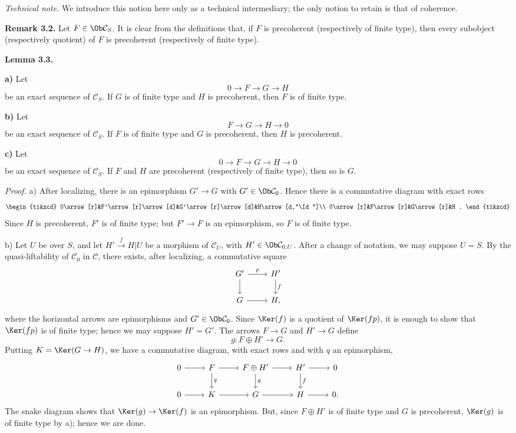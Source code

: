 \emph{Technical note.} We introduce this notion here only as a technical intermediary; the only notion to retain is that of coherence.

\textbf{Remark 3.2.} Let \(F\in\Ob\mathcal C_S\). It is clear from the definitions that, if \(F\) is precoherent (respectively of finite type), then every subobject (respectively quotient) of \(F\) is precoherent (respectively of finite type).

\textbf{Lemma 3.3.}

\textbf{a)} Let
\[
  0\longrightarrow F\longrightarrow G\longrightarrow H
\]
be an exact sequence of \(\mathcal C_S\). If \(G\) is of finite type and \(H\) is precoherent, then \(F\) is of finite type.

\textbf{b)} Let
\[
  F\longrightarrow G\longrightarrow H\longrightarrow 0
\]
be an exact sequence of \(\mathcal C_S\). If \(F\) is of finite type and \(G\) is precoherent, then \(H\) is precoherent.

\textbf{c)} Let
\[
  0\longrightarrow F\longrightarrow G\longrightarrow H\longrightarrow 0
\]
be an exact sequence of \(\mathcal C_S\). If \(F\) and \(H\) are precoherent (respectively of finite type), then so is \(G\).

\emph{Proof.} a) After localizing, there is an epimorphism \(G'\to G\) with \(G'\in\Ob\mathcal C_0\). Hence there is a commutative diagram with exact rows
\[
\begin{tikzcd}
0\arrow[r]&F'\arrow[r]\arrow[d]&G'\arrow[r]\arrow[d]&H\arrow[d,"\Id"]\\
0\arrow[r]&F\arrow[r]&G\arrow[r]&H .
\end{tikzcd}
\]
Since \(H\) is precoherent, \(F'\) is of finite type; but \(F'\to F\) is an epimorphism, so \(F\) is of finite type.

b) Let \(U\) be over \(S\), and let \(H'\xrightarrow{f}H|U\) be a morphism of \(\mathcal C_U\), with \(H'\in\Ob\mathcal C_{0,U}\). After a change of notation, we may suppose \(U=S\). By the quasi-liftability of \(\mathcal C_0\) in \(\mathcal C\), there exists, after localizing, a commutative square
\[
\begin{tikzcd}
G' \arrow[r,"p"] \arrow[d] & H' \arrow[d,"f"]\\
G \arrow[r] & H,
\end{tikzcd}
\]
where the horizontal arrows are epimorphisms and \(G'\in\Ob\mathcal C_0\). Since \(\Ker(f)\) is a quotient of \(\Ker(fp)\), it is enough to show that \(\Ker(fp)\) is of finite type; hence we may suppose \(H'=G'\). The arrows \(F\to G\) and \(H'\to G\) define
\[
  g:F\oplus H'\longrightarrow G.
\]
Putting \(K=\Ker(G\to H)\), we have a commutative diagram, with exact rows and with \(q\) an epimorphism,
\[
\begin{tikzcd}
0\arrow[r]&F\arrow[r]\arrow[d,"q"]&F\oplus H'\arrow[r]\arrow[d,"g"]&H'\arrow[r]\arrow[d,"f"]&0\\
0\arrow[r]&K\arrow[r]&G\arrow[r]&H\arrow[r]&0 .
\end{tikzcd}
\]
The snake diagram shows that \(\Ker(g)\to\Ker(f)\) is an epimorphism. But, since \(F\oplus H'\) is of finite type and \(G\) is precoherent, \(\Ker(g)\) is of finite type by a); hence we are done.

